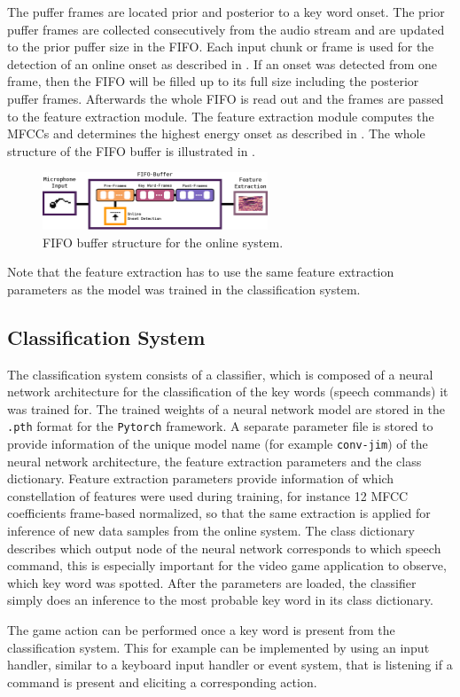 The puffer frames are located prior and posterior to a key word onset.
The prior puffer frames are collected consecutively from the audio stream and are updated to the prior puffer size in the FIFO. 
Each input chunk or frame is used for the detection of an online onset as described in .
If an onset was detected from one frame, then the FIFO will be filled up to its full size including the posterior puffer frames.
Afterwards the whole FIFO is read out and the frames are passed to the feature extraction module.
The feature extraction module computes the MFCCs and determines the highest energy onset as described in .
The whole structure of the FIFO buffer is illustrated in .
\begin{figure}[!ht]
  \centering
  \includegraphics[width=0.60\textwidth]{./6_game/figs/game_system_fifo}
  \caption{FIFO buffer structure for the online system.}
  \label{fig:game_system_fifo}
\end{figure}
\FloatBarrier
\noindent
Note that the feature extraction has to use the same feature extraction parameters as the model was trained in the classification system.



\subsection{Classification System}
The classification system consists of a classifier, which is composed of a neural network architecture for the classification of the key words (speech commands) it was trained for.
The trained weights of a neural network model are stored in the \texttt{.pth} format for the \texttt{Pytorch} framework.
A separate parameter file is stored to provide information of the unique model name (for example \texttt{conv-jim}) of the neural network architecture, the feature extraction parameters and the class dictionary.
Feature extraction parameters provide information of which constellation of features were used during training, for instance 12 MFCC coefficients frame-based normalized, so that the same extraction is applied for inference of new data samples from the online system.
The class dictionary describes which output node of the neural network corresponds to which speech command, this is especially important for the video game application to observe, which key word was spotted.
After the parameters are loaded, the classifier simply does an inference to the most probable key word in its class dictionary.

The game action can be performed once a key word is present from the classification system.
This for example can be implemented by using an input handler, similar to a keyboard input handler or event system, that is listening if a command is present and eliciting a corresponding action.

